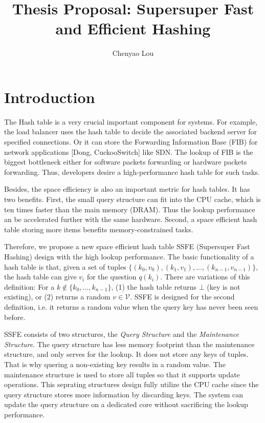 \documentclass{article}
\title{Thesis Proposal: Supersuper Fast and Efficient Hashing}
\author{Chenyao Lou}
\begin{document}
\maketitle

\newcommand{\qs}{\textit{Query Structure}\xspace}
\newcommand{\ms}{\textit{Maintenance Structure}\xspace}

\section{Introduction}


The Hash table is a very crucial important component for systems. For example, the load balancer uses the hash table to decide the associated backend server for specified connections. Or it can store the Forwarding Information Base (FIB) for network applications [Dong, CuckooSwitch] like SDN. The lookup of FIB is the biggest bottleneck either for software packets forwarding or hardware packets forwarding. Thus, developers desire a high-performance hash table for such tasks.

Besides, the space efficiency is also an important metric for hash tables. It has two benefits. First, the small query structure can fit into the CPU cache, which is ten times faster than the main memory (DRAM). Thus the lookup performance an be accelerated further with the same hardware. Second, a space efficient hash table storing more items benefits memory-constrained tasks.


Therefore, we propose a new space efficient hash table SSFE (Supersuper Fast Hashing) design with the high lookup performance. The basic functionality of a hash table is that, given a set of tuples $\{(k_0, v_0), (k_1, v_1), ..., (k_{n-1}, v_{n-1})\}$, the hash table can give $v_i$ for the question $q(k_i)$. There are variations of this definition: For a $k \not\in \{k_0, ..., k_{n-1}\}$, (1) the hash table returns $\bot$ (key is not existing), or (2) returns a random $v \in \mathcal{V}$. SSFE is designed for the second definition, i.e. it returns a random value when the query key has never been seen before.


SSFE consists of two structures, the \textit{Query Structure} and the \textit{Maintenance Structure}. The query structure has less memory footprint than the maintenance structure, and only serves for the lookup. It does not store any keys of tuples. That is why quering a non-existing key results in a random value. The maintenance structure is used to store all tuples so that it supports update operations. This seprating structures design fully utilize the CPU cache since the query structure stores more information by discarding keys. The system can update the query structure on a dedicated core without sacrificing the lookup performance.
\end{document}
